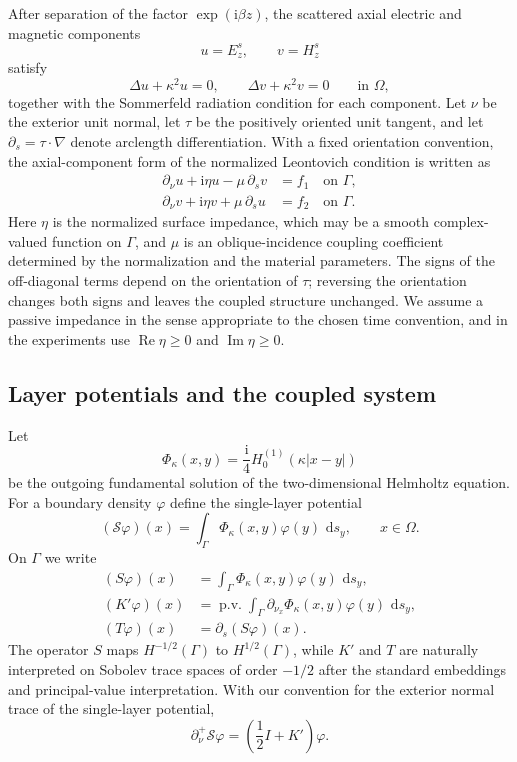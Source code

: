 \documentclass[10pt,a4paper]{amsart}
\numberwithin{equation}{section}
\newcommand{\ii}{\mathrm{i}}
\newcommand{\dd}{\,\mathrm{d}}
\begin{document}
After separation of the factor $\exp(\ii\beta z)$, the scattered axial electric and magnetic components
\[
u=E_z^s,\qquad v=H_z^s
\]
satisfy
\begin{equation}
\Delta u+\kappa^2u=0,\qquad \Delta v+\kappa^2v=0\qquad \text{in }\Omega,
\label{eq:helmholtz}
\end{equation}
together with the Sommerfeld radiation condition for each component. Let $\nu$ be the exterior unit normal, let $\tau$ be the positively oriented unit tangent, and let $\partial_s=\tau\cdot\nabla$ denote arclength differentiation. With a fixed orientation convention, the axial-component form of the normalized Leontovich condition is written as
\begin{align}
\partial_\nu u+\ii\eta u-\mu\,\partial_s v&=f_1 \quad \text{on }\Gamma, \label{eq:bc1}\\
\partial_\nu v+\ii\eta v+\mu\,\partial_s u&=f_2 \quad \text{on }\Gamma. \label{eq:bc2}
\end{align}
Here $\eta$ is the normalized surface impedance, which may be a smooth complex-valued function on $\Gamma$, and $\mu$ is an oblique-incidence coupling coefficient determined by the normalization and the material parameters. The signs of the off-diagonal terms depend on the orientation of $\tau$; reversing the orientation changes both signs and leaves the coupled structure unchanged. We assume a passive impedance in the sense appropriate to the chosen time convention, and in the experiments use $\operatorname{Re}\eta\ge0$ and $\operatorname{Im}\eta\ge0$.

\subsection{Layer potentials and the coupled system}

Let
\begin{equation}
\Phi_\kappa(x,y)=\frac{\ii}{4}H_0^{(1)}(\kappa |x-y|)
\end{equation}
be the outgoing fundamental solution of the two-dimensional Helmholtz equation. For a boundary density $\varphi$ define the single-layer potential
\begin{equation}
(\mathcal S\varphi)(x)=\int_\Gamma \Phi_\kappa(x,y)\varphi(y)\,\dd s_y,\qquad x\in\Omega.
\end{equation}
On $\Gamma$ we write
\begin{align}
(S\varphi)(x)&=\int_\Gamma \Phi_\kappa(x,y)\varphi(y)\,\dd s_y,\\
(K'\varphi)(x)&=\operatorname{p.v.}\int_\Gamma \partial_{\nu_x}\Phi_\kappa(x,y)\varphi(y)\,\dd s_y,\\
(T\varphi)(x)&=\partial_s(S\varphi)(x).
\end{align}
The operator $S$ maps $H^{-1/2}(\Gamma)$ to $H^{1/2}(\Gamma)$, while $K'$ and $T$ are naturally interpreted on Sobolev trace spaces of order $-1/2$ after the standard embeddings and principal-value interpretation. With our convention for the exterior normal trace of the single-layer potential,
\begin{equation}
\partial_\nu^+\mathcal S\varphi=\left(\frac12 I+K'\right)\varphi .
\end{equation}
\end{document}
